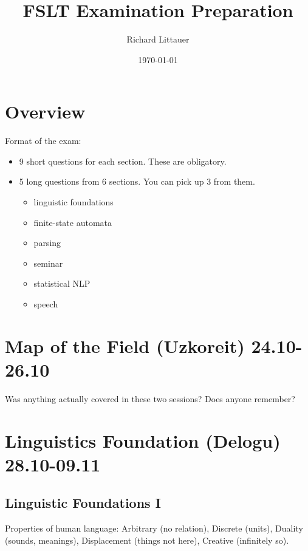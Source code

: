 \documentclass[11pt]{article}
\title{FSLT Examination Preparation}
\author{Richard Littauer}		%
\date{\today}                          		%
\newenvironment{itemise}{
\begin{itemize}
  \setlength{\itemsep}{1pt}
  \setlength{\parskip}{0pt}
  \setlength{\parsep}{0pt}
}{\end{itemize}}
\begin{document}
\maketitle
\tableofcontents

\section*{Overview}
Format of the exam:
\begin{itemise}
\item 9 short questions for each section. These are obligatory. 
\item 5 long questions from 6 sections. You can pick up 3 from them. 
\begin{itemise}
\item linguistic foundations
\item finite-state automata
\item parsing
\item seminar
\item statistical NLP
\item speech
\end{itemise}
\end{itemise}
\newpage
\section{Map of the Field (Uzkoreit) 24.10-26.10}

Was anything actually covered in these two sessions? Does anyone remember? 

\section{Linguistics Foundation (Delogu) 28.10-09.11}
\subsection{Linguistic Foundations I}
Properties of human language: Arbitrary (no relation), Discrete (units), Duality (sounds, meanings), Displacement (things not here), Creative (infinitely so).
\end{document}
